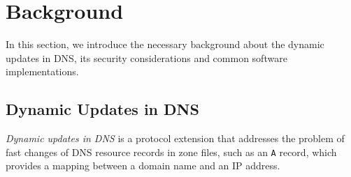 \section{Background}


In this section, we introduce the necessary background about the dynamic updates in DNS, its security considerations and common software implementations.

\subsection{Dynamic Updates in DNS}
%
\textit{Dynamic updates in DNS} is a protocol extension that addresses the problem of fast changes of DNS resource records in zone files, such as an \texttt{A} record, which provides a mapping between a domain name and an IP address.

